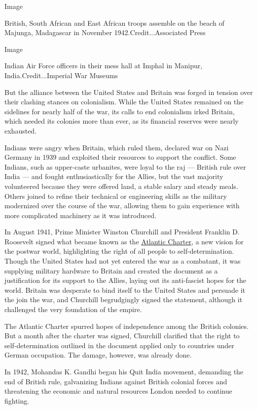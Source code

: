 Image

British, South African and East African troops assemble on the beach of
Majunga, Madagascar in November 1942.Credit...Associated Press

Image

Indian Air Force officers in their mess hall at Imphal in Manipur,
India.Credit...Imperial War Museums

But the alliance between the United States and Britain was forged in
tension over their clashing stances on colonialism. While the United
States remained on the sidelines for nearly half of the war, its calls
to end colonialism irked Britain, which needed its colonies more than
ever, as its financial reserves were nearly exhausted.

Indians were angry when Britain, which ruled them, declared war on Nazi
Germany in 1939 and exploited their resources to support the conflict.
Some Indians, such as upper-caste urbanites, were loyal to the raj ---
British rule over India --- and fought enthusiastically for the Allies,
but the vast majority volunteered because they were offered land, a
stable salary and steady meals. Others joined to refine their technical
or engineering skills as the military modernized over the course of the
war, allowing them to gain experience with more complicated machinery as
it was introduced.

In August 1941, Prime Minister Winston Churchill and President Franklin
D. Roosevelt signed what became known as the
\href{https://www.un.org/en/sections/history-united-nations-charter/1941-atlantic-charter/index.html}{Atlantic
Charter}, a new vision for the postwar world, highlighting the right of
all people to self-determination. Though the United States had not yet
entered the war as a combatant, it was supplying military hardware to
Britain and created the document as a justification for its support to
the Allies, laying out its anti-fascist hopes for the world. Britain was
desperate to bind itself to the United States and persuade it the join
the war, and Churchill begrudgingly signed the statement, although it
challenged the very foundation of the empire.

The Atlantic Charter spurred hopes of independence among the British
colonies. But a month after the charter was signed, Churchill clarified
that the right to self-determination outlined in the document applied
only to countries under German occupation. The damage, however, was
already done.

In 1942, Mohandas K. Gandhi began his Quit India movement, demanding the
end of British rule, galvanizing Indians against British colonial forces
and threatening the economic and natural resources London needed to
continue fighting.


